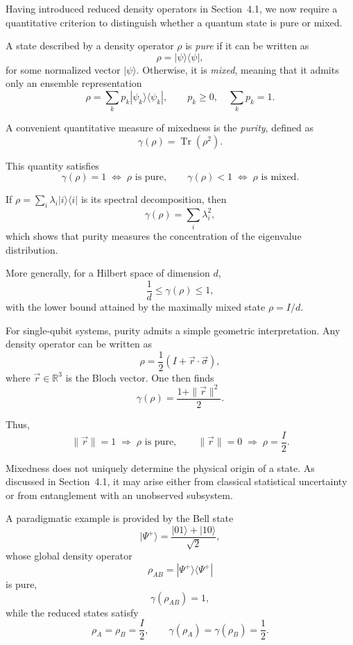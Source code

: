 \documentclass[a4paper]{article}
\begin{document}
Having introduced reduced density operators in Section~4.1, we now require a quantitative criterion to distinguish whether a quantum state is pure or mixed.

A state described by a density operator \( \rho \) is \emph{pure} if it can be written as
\[
\rho = |\psi\rangle \langle \psi|,
\]
for some normalized vector \( |\psi\rangle \). Otherwise, it is \emph{mixed}, meaning that it admits only an ensemble representation
\[
\rho = \sum_k p_k |\psi_k\rangle \langle \psi_k|, 
\qquad p_k \ge 0, \quad \sum_k p_k = 1.
\]

\medskip

A convenient quantitative measure of mixedness is the \emph{purity}, defined as
\[
\gamma(\rho) = \operatorname{Tr}(\rho^2).
\]

This quantity satisfies
\[
\gamma(\rho) = 1 \;\Longleftrightarrow\; \rho \text{ is pure}, 
\qquad
\gamma(\rho) < 1 \;\Longleftrightarrow\; \rho \text{ is mixed}.
\]

If \( \rho = \sum_i \lambda_i |i\rangle \langle i| \) is its spectral decomposition, then
\[
\gamma(\rho) = \sum_i \lambda_i^2,
\]
which shows that purity measures the concentration of the eigenvalue distribution.

More generally, for a Hilbert space of dimension \( d \),
\[
\frac{1}{d} \le \gamma(\rho) \le 1,
\]
with the lower bound attained by the maximally mixed state \( \rho = I/d \).

\medskip

For single-qubit systems, purity admits a simple geometric interpretation. Any density operator can be written as
\[
\rho = \frac{1}{2}\left(I + \vec{r} \cdot \vec{\sigma}\right),
\]
where \( \vec{r} \in \mathbb{R}^3 \) is the Bloch vector. One then finds
\[
\gamma(\rho) = \frac{1 + \|\vec{r}\|^2}{2}.
\]

Thus,
\[
\|\vec{r}\| = 1 \;\Rightarrow\; \rho \text{ is pure}, 
\qquad
\|\vec{r}\| = 0 \;\Rightarrow\; \rho = \frac{I}{2}.
\]

\medskip

Mixedness does not uniquely determine the physical origin of a state. As discussed in Section~4.1, it may arise either from classical statistical uncertainty or from entanglement with an unobserved subsystem.

\medskip

A paradigmatic example is provided by the Bell state
\[
|\Psi^+\rangle = \frac{|01\rangle + |10\rangle}{\sqrt{2}},
\]
whose global density operator
\[
\rho_{AB} = |\Psi^+\rangle \langle \Psi^+|
\]
is pure,
\[
\gamma(\rho_{AB}) = 1,
\]
while the reduced states satisfy
\[
\rho_A = \rho_B = \frac{I}{2}, 
\qquad
\gamma(\rho_A) = \gamma(\rho_B) = \frac{1}{2}.
\]
\end{document}
